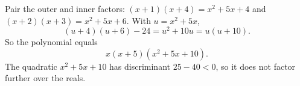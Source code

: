 Pair the outer and inner factors: $(x+1)(x+4)=x^2+5x+4$ and $(x+2)(x+3)=x^2+5x+6$. With $u=x^2+5x$,
\[
(u+4)(u+6)-24=u^2+10u=u(u+10).
\]
So the polynomial equals
\[
\boxed{x(x+5)(x^2+5x+10)} .
\]
The quadratic $x^2+5x+10$ has discriminant $25-40<0$, so it does not factor further over the reals.
